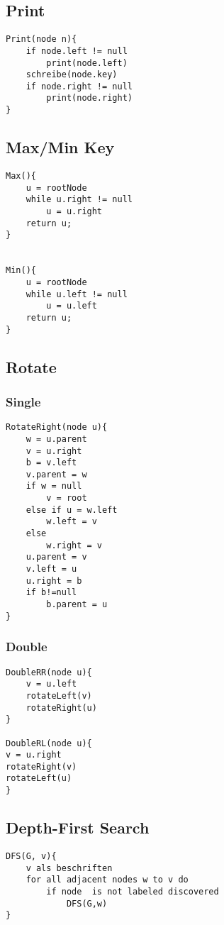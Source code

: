 \documentclass[10pt,a4paper]{article}
\begin{document}
	\subsection{Print}
		\begin{lstlisting}
Print(node n){
	if node.left != null
		print(node.left)
	schreibe(node.key)
	if node.right != null
		print(node.right)
}
		\end{lstlisting}
	\subsection{Max/Min Key}
		\begin{lstlisting}
Max(){
	u = rootNode
	while u.right != null
		u = u.right
	return u;
}


Min(){
	u = rootNode
	while u.left != null
		u = u.left
	return u;
}
		\end{lstlisting}
	\subsection{Rotate}
		\subsubsection{Single} %
			\begin{lstlisting} 
RotateRight(node u){
	w = u.parent
	v = u.right
	b = v.left
	v.parent = w
	if w = null
		v = root
	else if u = w.left 
		w.left = v
	else
		w.right = v
	u.parent = v
	v.left = u
	u.right = b
	if b!=null
		b.parent = u
}
			\end{lstlisting}
		\subsubsection{Double}
			\begin{lstlisting}
DoubleRR(node u){
	v = u.left
	rotateLeft(v)
	rotateRight(u)
}

DoubleRL(node u){
v = u.right
rotateRight(v)
rotateLeft(u)
}
			\end{lstlisting}
		\subsection{Depth-First Search}
			\begin{lstlisting}
DFS(G, v){
	v als beschriften
	for all adjacent nodes w to v do
		if node  is not labeled discovered 
			DFS(G,w)
}
			\end{lstlisting}
\end{document}
